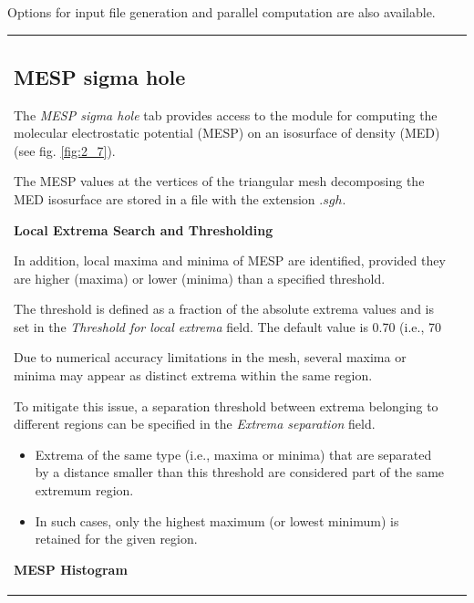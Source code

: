\documentclass[10pt]{article}
\begin{document}
Options for input file generation and parallel computation
are also available.


\vspace*{5mm}
\begin{tabular}{lr}
\hspace*{-3mm}
\begin{minipage}{.6\linewidth}


\subsection{MESP sigma hole \label{sec:2.7}\index{MESP sigma hole}}

The {\it MESP sigma hole} tab provides access to the module for computing
the molecular electrostatic potential (MESP) on an isosurface
of density (MED) (see fig. \ref{fig:2_7}).

The MESP values at the vertices of the triangular mesh
decomposing the MED isosurface are stored in a file
with the extension $.sgh$.

\vspace*{3mm}
{\bf Local Extrema Search and Thresholding}
\vspace*{3mm}

In addition, local maxima and minima of MESP are identified,
provided they are higher (maxima) or lower (minima)
than a specified threshold.

The threshold is defined as a fraction
of the absolute extrema values and is set in the {\it Threshold for local extrema} field.
The default value is 0.70 (i.e., 70%

Due to numerical accuracy limitations in the mesh,
several maxima or minima may appear as distinct extrema
within the same region.

To mitigate this issue, a separation threshold
between extrema belonging to different regions
can be specified in the {\it Extrema separation} field.

\begin{itemize}
\item Extrema of the same type (i.e., maxima or minima)
that are separated by a distance smaller than this threshold
are considered part of the same extremum region.
\item In such cases, only the highest maximum (or lowest minimum)
is retained for the given region.
\end{itemize}

\vspace*{3mm}
{\bf MESP Histogram}
\vspace*{3mm}


\end{minipage}
\end{tabular}
\end{document}
